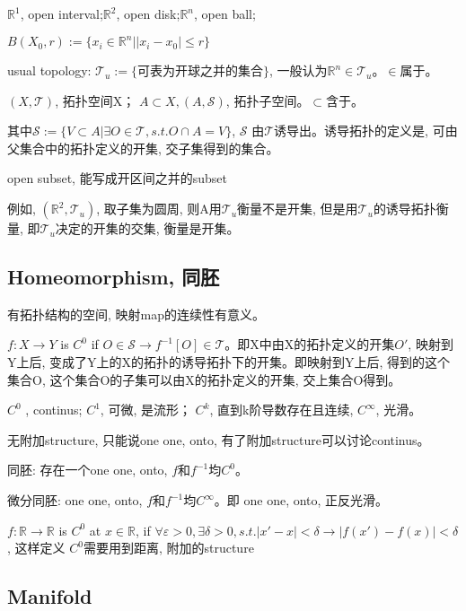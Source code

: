 \documentclass[UTF8]{../09-Mathematics}
\begin{document}
$\mathbb{R}^1$, open interval;$\mathbb{R}^2$, open disk;$\mathbb{R}^n$, open ball;

$B(X_0, r) := \{ x_i \in \mathbb{R}^n |   |x_i - x_0| \leq r\}$

usual topology: $\mathscr T_u := \{ \mbox{可表为开球之并的集合}\}$, 一般认为$\mathbb{R}^n \in \mathscr T_u $。$\in$属于。

$(X, \mathscr T)$, 拓扑空间X；
$A \subset X,  (A, \mathscr S)$,  拓扑子空间。$ \subset $含于。

其中$\mathscr S := \{  V \subset A | \exists O \in \mathscr T, s.t. O \cap A = V\}$, $\mathscr S$ 由$\mathscr T$诱导出。诱导拓扑的定义是, 可由父集合中的拓扑定义的开集, 交子集得到的集合。

open subset, 能写成开区间之并的subset 

例如, $(\mathbb R^2, \mathscr T_u)$, 取子集为圆周, 则A用$\mathscr T_u$衡量不是开集, 但是用$\mathscr T_u$的诱导拓扑衡量, 即$\mathscr T_u$决定的开集的交集, 衡量是开集。


\subsection{Homeomorphism, 同胚}

有拓扑结构的空间, 映射map的连续性有意义。

$f:X \to Y$ is $C^0$ if $ O \in \mathscr S \rightarrow f^{-1}[O] \in \mathscr T$。即X中由X的拓扑定义的开集$O'$, 映射到Y上后, 变成了Y上的X的拓扑的诱导拓扑下的开集。即映射到Y上后, 得到的这个集合O, 这个集合O的子集可以由X的拓扑定义的开集, 交上集合O得到。

$C^0$ ,  continus; $C^1$, 可微, 是流形； $C^k$, 直到k阶导数存在且连续,  $C^\infty$, 光滑。


无附加structure, 只能说one one, onto,  有了附加structure可以讨论continus。

同胚: 存在一个one one, onto,  $f$和$f^{-1}$均$C^0$。

微分同胚: one one, onto,  $f$和$f^{-1}$均$C^\infty$。即 one one, onto,  正反光滑。

$f: \mathbb{R} \to \mathbb{R} $ is $C^0$ at $x\in  \mathbb{R}$, if $\forall \varepsilon >0, \exists \delta >0, s.t. |x' - x| < \delta \rightarrow |f(x') - f(x)| <   \delta$, 这样定义 $C^0$需要用到距离, 附加的structure


\subsection{Manifold}
\end{document}

